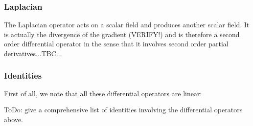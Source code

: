 \subsubsection{Laplacian}
The Laplacian operator acts on a scalar field and produces another scalar field. It is actually the divergence of the gradient (VERIFY!) and is therefore a second order differential operator in the sense that it involves second order partial derivatives...TBC...



\subsubsection{Identities}
First of all, we note that all these differential operators are linear:

ToDo: give a comprehensive list of identities involving the differential operators above.






